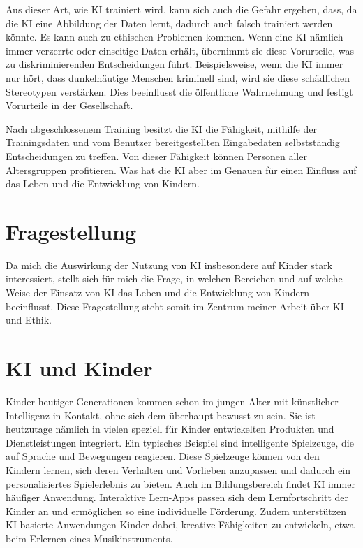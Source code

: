 \documentclass{article}
\begin{document}
Aus dieser Art, wie KI trainiert wird, kann sich auch die Gefahr ergeben, dass, da die KI eine Abbildung der Daten lernt, dadurch auch falsch trainiert werden könnte. Es kann auch zu ethischen Problemen kommen.
Wenn eine KI nämlich immer verzerrte oder einseitige Daten erhält, übernimmt sie diese Vorurteile, was zu diskriminierenden Entscheidungen führt. Beispielsweise, wenn die KI immer nur hört, dass dunkelhäutige Menschen kriminell sind, wird sie diese schädlichen Stereotypen verstärken. Dies beeinflusst die öffentliche Wahrnehmung und festigt Vorurteile in der Gesellschaft.

Nach abgeschlossenem Training besitzt die KI die Fähigkeit, mithilfe der Trainingsdaten und vom Benutzer bereitgestellten Eingabedaten selbstständig Entscheidungen zu treffen. Von dieser Fähigkeit können Personen aller Altersgruppen profitieren. Was hat die KI aber im Genauen für einen Einfluss auf das Leben und die Entwicklung von Kindern.

\section{Fragestellung}

Da mich die Auswirkung der Nutzung von KI insbesondere auf Kinder stark interessiert, stellt sich für mich die Frage, in welchen Bereichen und auf welche Weise der Einsatz von KI das Leben und die Entwicklung von Kindern beeinflusst. Diese Fragestellung steht somit im Zentrum meiner Arbeit über KI und Ethik.

\section{KI und Kinder}

Kinder heutiger Generationen kommen schon im jungen Alter mit künstlicher Intelligenz in Kontakt, ohne sich dem überhaupt bewusst zu sein. Sie ist heutzutage nämlich in vielen speziell für Kinder entwickelten Produkten und Dienstleistungen integriert.
Ein typisches Beispiel sind intelligente Spielzeuge, die auf Sprache und Bewegungen reagieren. Diese Spielzeuge können von den Kindern lernen, sich deren Verhalten und Vorlieben anzupassen und dadurch ein personalisiertes Spielerlebnis zu bieten.
Auch im Bildungsbereich findet KI immer häufiger Anwendung. Interaktive Lern-Apps passen sich dem Lernfortschritt der Kinder an und ermöglichen so eine individuelle Förderung. Zudem unterstützen KI-basierte Anwendungen Kinder dabei, kreative Fähigkeiten zu entwickeln, etwa beim Erlernen eines Musikinstruments.
\end{document}
